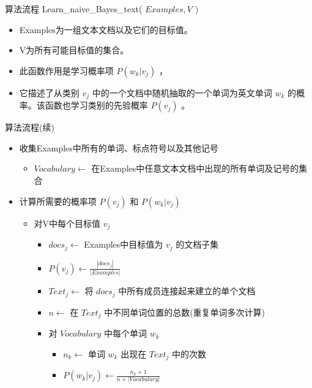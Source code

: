 \documentclass[presentation]{beamer}
\begin{document}
\begin{frame}[label={sec:org3ee5df0}]{算法流程}
Learn\_naive\_Bayes\_text( \(Examples, V\) )
\begin{itemize}
\item Examples为一组文本文档以及它们的目标值。
\item V为所有可能目标值的集合。
\item 此函数作用是学习概率项 \(P(w_k|v_j)\) ，
\item 它描述了从类别 \(v_j\) 中的一个文档中随机抽取的一个单词为英文单词 \(w_k\) 的概率。该函数也学习类别的先验概率 \(P(v_j)\) 。
\end{itemize}
\end{frame}

\begin{frame}[label={sec:org3ec176c}]{算法流程(续)}
\begin{itemize}
\item 收集Examples中所有的单词、标点符号以及其他记号
\begin{itemize}
\item \(Vocabulary \leftarrow\) 在Examples中任意文本文档中出现的所有单词及记号的集合
\end{itemize}
\item 计算所需要的概率项 \(P(v_j)\) 和 \(P(w_k|v_j)\)
\begin{itemize}
\item 对V中每个目标值 \(v_j\)
\begin{itemize}
\item \(docs_{j} \leftarrow\) Examples中目标值为 \(v_j\) 的文档子集
\item \(P(v_{j}) \leftarrow \frac{|docs_{j}|}{|Examples|}\)
\item \(Text_{j} \leftarrow\) 将 \(docs_j\) 中所有成员连接起来建立的单个文档
\item \(n \leftarrow\) 在 \(Text_j\) 中不同单词位置的总数(重复单词多次计算)
\item 对 \(Vocabulary\) 中每个单词 \(w_k\)
\begin{itemize}
\item \(n_{k} \leftarrow\) 单词 \(w_k\) 出现在 \(Text_j\) 中的次数
\item \(P(w_{k}|v_{j}) \leftarrow \frac{n_{k} + 1}{n + |Vocabulary|}\)
\end{itemize}
\end{itemize}
\end{itemize}
\end{itemize}
\end{frame}
\end{document}
